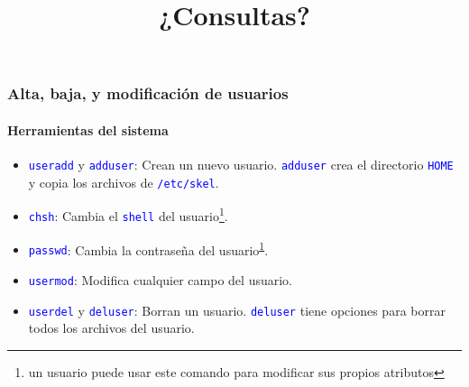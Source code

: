 \documentclass[11pt,a4paper,spanish]{beamer}
\newcommand{\codeword}[1]{\mbox{\texttt{\textcolor{blue}{#1}}}}
\begin{document}
\begin{frame}

    \frametitle{Alta, baja, y modificación de usuarios}
    \framesubtitle{Herramientas del sistema}

    \begin{itemize}
        \item \codeword{useradd} y \codeword{adduser}: Crean un nuevo usuario.
            \codeword{adduser} crea el directorio \codeword{HOME} y copia los
            archivos de \codeword{/etc/skel}.
        \item \codeword{chsh}: Cambia el \codeword{shell} del
            usuario\footnote{un usuario puede usar este comando para modificar
            sus propios atributos\label{fnCHSH}}.
        \item \codeword{passwd}: Cambia la contraseña del
            usuario\textsuperscript{\ref{fnCHSH}}.
        \item \codeword{usermod}: Modifica cualquier campo del usuario.
        \item \codeword{userdel} y \codeword{deluser}: Borran un usuario.
            \codeword{deluser} tiene opciones para borrar todos los archivos
            del usuario.
    \end{itemize}

\end{frame}


\begin{frame}

\title{¿Consultas?}
\maketitle

\end{frame}
%
%
%
%
%
%
%
\end{document}
